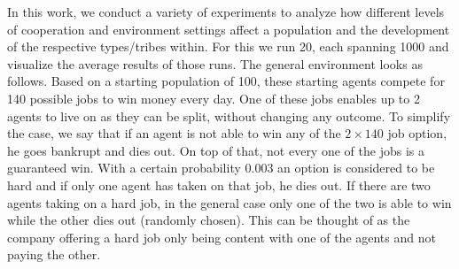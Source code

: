 \documentclass[sigconf]{acmart}
\newcommand{\todo}[1]{{\color{red}{#1}}}
\newcommand{\VNumSimulations}{20\xspace}
\newcommand{\VNumDays}{1000\xspace}
\newcommand{\VNumPop}{100\xspace}
\newcommand{\VNumTrees}{140\xspace}
\newcommand{\VProbPredator}{0.003\xspace}
\begin{document}
    \todo{Indirect reciprocity}


    \todo{relate this to related work/experiments}

    In this work, we conduct a variety of experiments to analyze how different levels of cooperation and environment settings affect a population and the development of the respective types/tribes within.
    For this we run \VNumSimulations, each spanning \VNumDays and visualize the average results of those runs.
    The general environment looks as follows.
    Based on a starting population of \VNumPop, these starting agents compete for \VNumTrees possible jobs to win money every day.
    One of these jobs enables up to 2 agents to live on as they can be split, without changing any outcome.
    To simplify the case, we say that if an agent is not able to win any of the $2 \times \VNumTrees$ job option, he goes bankrupt and dies out.
    On top of that, not every one of the jobs is a guaranteed win.
    With a certain probability \VProbPredator an option is considered to be hard and if only one agent has taken on that job, he dies out.
    If there are two agents taking on a hard job, in the general case only one of the two is able to win while the other dies out (randomly chosen).
    This can be thought of as the company offering a hard job only being content with one of the agents and not paying the other.
\end{document}
